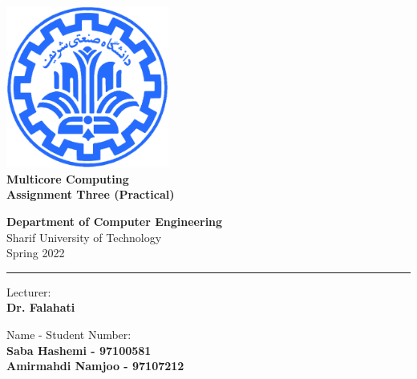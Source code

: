 \documentclass[12pt]{article}
\begin{document}
	
	
\begin{titlepage}
	\begin{center}
		
		\vspace*{0.7cm}
		
		\includegraphics[width=0.4\textwidth]{sharif1.png}\\
		\vspace{0.5cm}
		\textbf{ \Huge{Multicore Computing} }\\
		\vspace{0.5cm}
		\textbf{ \Large{ Assignment Three (Practical)} }
		\vspace{0.2cm}
		
		
		\large \textbf{Department of Computer Engineering}\\\vspace{0.2cm}
		\large   Sharif University of Technology\\\vspace{0.2cm}
		\large   Spring 2022 \\\vspace{0.2cm}
		\noindent\rule[1ex]{\linewidth}{1pt}
		Lecturer:\\
		\textbf{{Dr. Falahati}}
		
		
		\vspace{0.15cm}
		Name - Student Number:\\
		
		\textbf{{Saba Hashemi - 97100581}}\\
		
		\textbf{{Amirmahdi Namjoo - 97107212}}
	\end{center}
\end{titlepage}


\newpage
\pagestyle{fancy}
\fancyhf{}
\fancyfoot{}
\cfoot{\thepage}
\end{document}
